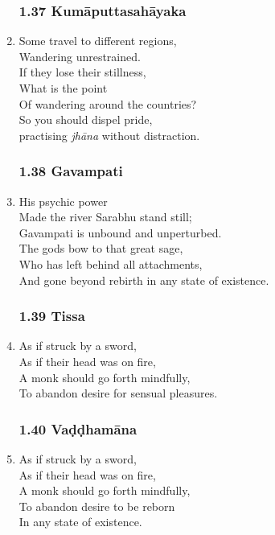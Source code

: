 \documentclass[10pt, openany]{book}
\begin{document}
\begin{enumerate}
\subsubsection*{1.37 Kumāputtasahāyaka}

\item Some travel to different regions,\\
Wandering unrestrained.\\
If they lose their stillness,\\
What is the point\\
Of wandering around the countries?\\
So you should dispel pride,\\
practising \emph{jhāna} without distraction.

\subsubsection*{1.38 Gavampati}

\item His psychic power \\
Made the river Sarabhu stand still;\\
Gavampati is unbound and unperturbed.\\
The gods bow to that great sage,\\
Who has left behind all attachments, \\
And gone beyond rebirth in any state of existence.

\subsubsection*{1.39 Tissa}

\item As if struck by a sword,\\
As if their head was on fire,\\
A monk should go forth mindfully,\\
To abandon desire for sensual pleasures.

\subsubsection*{1.40 Vaḍḍhamāna}

\item As if struck by a sword,\\
As if their head was on fire,\\
A monk should go forth mindfully,\\
To abandon desire to be reborn \\
In any state of existence.


\end{enumerate}
\end{document}
